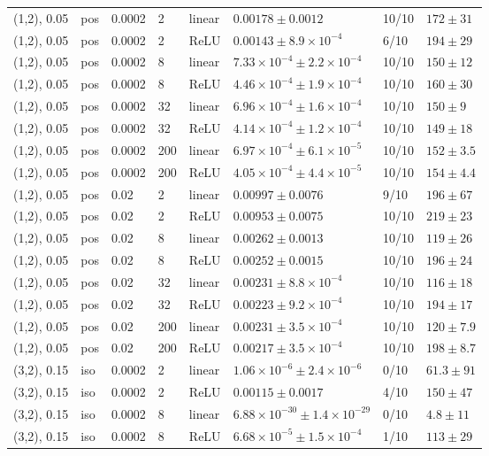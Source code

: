 \begin{table}[t]
\begin{tabular}{llllllll}
(1,2), 0.05 & pos & 0.0002 & 2 & linear & $0.00178\pm0.0012$ & 10/10 & $172\pm31$ \\
(1,2), 0.05 & pos & 0.0002 & 2 & ReLU & $0.00143\pm8.9\times10^{-4}$ & 6/10 & $194\pm29$ \\
(1,2), 0.05 & pos & 0.0002 & 8 & linear & $7.33\times10^{-4}\pm2.2\times10^{-4}$ & 10/10 & $150\pm12$ \\
(1,2), 0.05 & pos & 0.0002 & 8 & ReLU & $4.46\times10^{-4}\pm1.9\times10^{-4}$ & 10/10 & $160\pm30$ \\
(1,2), 0.05 & pos & 0.0002 & 32 & linear & $6.96\times10^{-4}\pm1.6\times10^{-4}$ & 10/10 & $150\pm9$ \\
(1,2), 0.05 & pos & 0.0002 & 32 & ReLU & $4.14\times10^{-4}\pm1.2\times10^{-4}$ & 10/10 & $149\pm18$ \\
(1,2), 0.05 & pos & 0.0002 & 200 & linear & $6.97\times10^{-4}\pm6.1\times10^{-5}$ & 10/10 & $152\pm3.5$ \\
(1,2), 0.05 & pos & 0.0002 & 200 & ReLU & $4.05\times10^{-4}\pm4.4\times10^{-5}$ & 10/10 & $154\pm4.4$ \\
(1,2), 0.05 & pos & 0.02 & 2 & linear & $0.00997\pm0.0076$ & 9/10 & $196\pm67$ \\
(1,2), 0.05 & pos & 0.02 & 2 & ReLU & $0.00953\pm0.0075$ & 10/10 & $219\pm23$ \\
(1,2), 0.05 & pos & 0.02 & 8 & linear & $0.00262\pm0.0013$ & 10/10 & $119\pm26$ \\
(1,2), 0.05 & pos & 0.02 & 8 & ReLU & $0.00252\pm0.0015$ & 10/10 & $196\pm24$ \\
(1,2), 0.05 & pos & 0.02 & 32 & linear & $0.00231\pm8.8\times10^{-4}$ & 10/10 & $116\pm18$ \\
(1,2), 0.05 & pos & 0.02 & 32 & ReLU & $0.00223\pm9.2\times10^{-4}$ & 10/10 & $194\pm17$ \\
(1,2), 0.05 & pos & 0.02 & 200 & linear & $0.00231\pm3.5\times10^{-4}$ & 10/10 & $120\pm7.9$ \\
(1,2), 0.05 & pos & 0.02 & 200 & ReLU & $0.00217\pm3.5\times10^{-4}$ & 10/10 & $198\pm8.7$ \\
(3,2), 0.15 & iso & 0.0002 & 2 & linear & $1.06\times10^{-6}\pm2.4\times10^{-6}$ & 0/10 & $61.3\pm91$ \\
(3,2), 0.15 & iso & 0.0002 & 2 & ReLU & $0.00115\pm0.0017$ & 4/10 & $150\pm47$ \\
(3,2), 0.15 & iso & 0.0002 & 8 & linear & $6.88\times10^{-30}\pm1.4\times10^{-29}$ & 0/10 & $4.8\pm11$ \\
(3,2), 0.15 & iso & 0.0002 & 8 & ReLU & $6.68\times10^{-5}\pm1.5\times10^{-4}$ & 1/10 & $113\pm29$ \\

\end{tabular}
\end{table}
